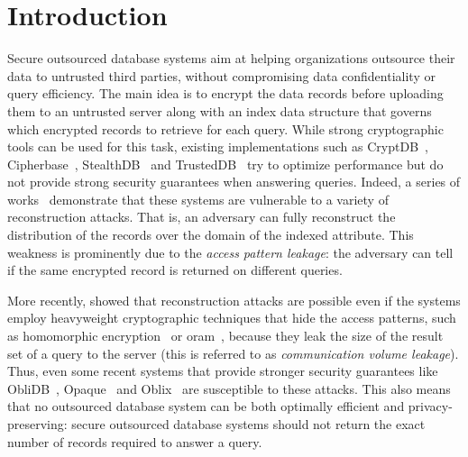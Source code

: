 \section{Introduction}

	Secure outsourced database systems aim at helping organizations outsource their data to untrusted third parties, without compromising data confidentiality or query efficiency.
	The main idea is to encrypt the data records before uploading them to an untrusted server along with an index data structure that governs which encrypted records to retrieve for each query.
	While strong cryptographic tools can be used for this task, existing implementations such as CryptDB~\cite{crypt-db}, Cipherbase~\cite{cipherbase-daas}, StealthDB~\cite{stealth-db} and TrustedDB~\cite{trusted-db} try to optimize performance but do not provide strong security guarantees when answering queries.
	Indeed, a series of works~\cite{multidimensional-range-queries, inference-attack-inference-attack-islam-14, leakage-abuse-attacks-cash-15, inference-attacks-naveed-15, generic-attacks-kellaris, attacks-tao-of-inference, grubbs-attacks, access-pattern-disclosure, attacks-improved-reconstruction} demonstrate that these systems are vulnerable to a variety of reconstruction attacks.
	That is, an adversary can fully reconstruct the distribution of the records over the domain of the indexed attribute.
	This weakness is prominently due to the \emph{access pattern leakage}: the adversary can tell if the same encrypted record is returned on different queries.

	More recently, \cite{generic-attacks-kellaris, state-of-uniform, attacks-improved-reconstruction, pump-volume-attacks, volume-range-attacks} showed that reconstruction attacks are possible even if the systems employ heavyweight cryptographic techniques that hide the access patterns, such as homomorphic encryption~\cite{arbitrary-functions-encrypted, fully-homomorphic-encryption} or \acrfull{oram}~\cite{oram-theory, oram-original}, because they leak the size of the result set of a query to the server (this is referred to as \emph{communication volume leakage}). %
	Thus, even some recent systems that provide stronger security guarantees like ObliDB~\cite{oblidb}, Opaque~\cite{opaque} and Oblix~\cite{oblix} are susceptible to these attacks. %
	This also means that no outsourced database system can be both optimally efficient and privacy-preserving: secure outsourced database systems should not return the exact number of records required to answer a query.

